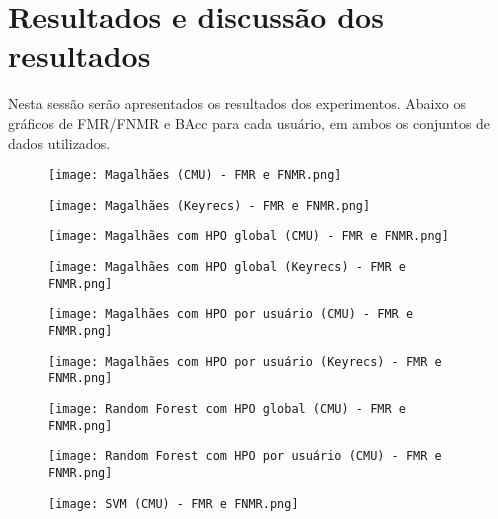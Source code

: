 \section{Resultados e discussão dos resultados}\label{sec:resultados}

Nesta sessão serão apresentados os resultados dos experimentos. Abaixo os gráficos de FMR/FNMR e BAcc para cada usuário, em ambos os conjuntos de dados utilizados.


\begin{figure}[H]
    \caption
    \label{}
    \centering
    \texttt{[image: Magalhães (CMU) - FMR e FNMR.png]}
\end{figure}
\begin{figure}[H]
    \caption
    \label{}
    \centering
    \texttt{[image: Magalhães (Keyrecs) - FMR e FNMR.png]}
\end{figure}
\begin{figure}[H]
    \caption
    \label{}
    \centering
    \texttt{[image: Magalhães com HPO global (CMU) - FMR e FNMR.png]}
\end{figure}
\begin{figure}[H]
    \caption
    \label{}
    \centering
    \texttt{[image: Magalhães com HPO global (Keyrecs) - FMR e FNMR.png]}
\end{figure}
\begin{figure}[H]
    \caption
    \label{}
    \centering
    \texttt{[image: Magalhães com HPO por usuário (CMU) - FMR e FNMR.png]}
\end{figure}
\begin{figure}[H]
    \caption
    \label{}
    \centering
    \texttt{[image: Magalhães com HPO por usuário (Keyrecs) - FMR e FNMR.png]}
\end{figure}
\begin{figure}[H]
    \caption
    \label{}
    \centering
    \texttt{[image: Random Forest com HPO global (CMU) - FMR e FNMR.png]}
\end{figure}
\begin{figure}[H]
    \caption
    \label{}
    \centering
    \texttt{[image: Random Forest com HPO por usuário (CMU) - FMR e FNMR.png]}
\end{figure}
\begin{figure}[H]
    \caption
    \label{}
    \centering
    \texttt{[image: SVM (CMU) - FMR e FNMR.png]}
\end{figure}
